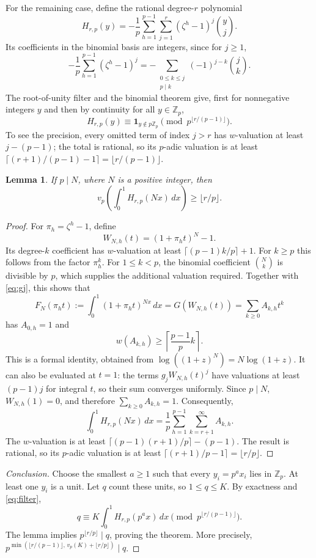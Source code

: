 \documentclass[11pt]{article}
\newtheorem{lemma}[theorem]{Lemma}
\newcommand{\Z}{\mathbb Z}
\begin{document}
For the remaining case, define the rational degree-$r$ polynomial
\[
 H_{r,p}(y)=-\frac1p\sum_{h=1}^{p-1}\sum_{j=1}^r
                   (\zeta^h-1)^j\binom yj.
\]
Its coefficients in the binomial basis are integers, since for $j\geq1$,
\[
 -\frac1p\sum_{h=1}^{p-1}(\zeta^h-1)^j
  =-\sum_{\substack{0\leq k\leq j\\p\mid k}}
                       (-1)^{j-k}\binom jk.
\]
The root-of-unity filter and the binomial theorem give, first for
nonnegative integers $y$ and then by continuity for all $y\in\Z_p$,
\begin{equation}\label{eq:filter}
 H_{r,p}(y)\equiv\boldsymbol1_{y\notin p\Z_p}
       \pmod {p^{\lfloor r/(p-1)\rfloor}}.
\end{equation}
To see the precision, every omitted term of index $j>r$ has
$w$-valuation at least $j-(p-1)$; the total is rational, so its
$p$-adic valuation is at least
$\lceil(r+1)/(p-1)-1\rceil=\lfloor r/(p-1)\rfloor$.

\begin{lemma}
If $p\mid N$, where $N$ is a positive integer, then
\[
 v_p\left(\int_0^1 H_{r,p}(Nx)\,dx\right)\geq\lfloor r/p\rfloor.
\]
\end{lemma}
\begin{proof}
For $\pi_h=\zeta^h-1$, define
\[
 W_{N,h}(t)=(1+\pi_h t)^N-1.
\]
Its degree-$k$ coefficient has $w$-valuation at least
$\lceil(p-1)k/p\rceil+1$.
For $k\geq p$ this follows from the factor $\pi_h^k$.
For $1\leq k<p$, the binomial coefficient $\binom Nk$ is divisible by $p$,
which supplies the additional valuation required.
Together with \eqref{eq:gj}, this shows that
\[
 F_N(\pi_h t):=\int_0^1(1+\pi_h t)^{Nx}\,dx
    =G(W_{N,h}(t))=\sum_{k\geq0}A_{k,h}t^k
\]
has $A_{0,h}=1$ and
\[
 w(A_{k,h})\geq\left\lceil\frac{p-1}{p}k\right\rceil.
\]
This is a formal identity, obtained from
$\log((1+z)^N)=N\log(1+z)$.
It can also be evaluated at $t=1$: the terms
$g_jW_{N,h}(t)^j$ have valuations at least $(p-1)j$ for integral $t$,
so their sum converges uniformly. Since $p\mid N$,
$W_{N,h}(1)=0$, and therefore $\sum_{k\geq0}A_{k,h}=1$.
Consequently,
\[
 \int_0^1H_{r,p}(Nx)\,dx
   =\frac1p\sum_{h=1}^{p-1}\sum_{k=r+1}^{\infty}A_{k,h}.
\]
The $w$-valuation is at least
$\lceil(p-1)(r+1)/p\rceil-(p-1)$.
The result is rational, so its $p$-adic valuation is at least
$\lceil(r+1)/p-1\rceil=\lfloor r/p\rfloor$.
\end{proof}

\begin{proof}[Conclusion]
Choose the smallest $a\geq1$ such that every $y_i=p^a x_i$ lies in $\Z_p$.
At least one $y_i$ is a unit. Let $q$ count these units, so $1\leq q\leq K$.
By exactness and \eqref{eq:filter},
\[
 q\equiv K\int_0^1H_{r,p}(p^a x)\,dx
             \pmod {p^{\lfloor r/(p-1)\rfloor}}.
\]
The lemma implies $p^{\lfloor r/p\rfloor}\mid q$, proving the theorem.
More precisely,
$p^{\min(\lfloor r/(p-1)\rfloor,\,v_p(K)+\lfloor r/p\rfloor)}\mid q$.
\end{proof}
\end{document}
